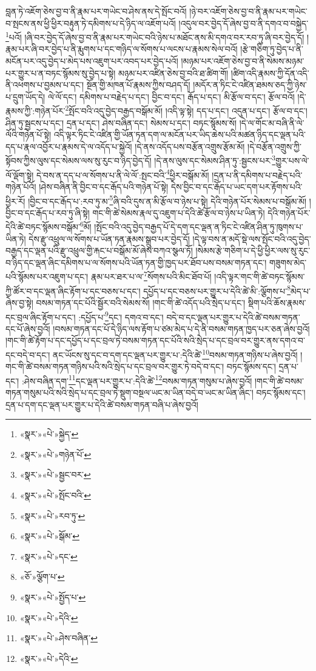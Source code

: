 བླན་ཏེ་འཇོག་ཅེས་བྱ་བ་ནི་རྣམ་པར་གཡེང་བ་ཤེས་ནས་དེ་སྤོང་བའོ། །ཉེ་བར་འཇོག་ཅེས་བྱ་བ་ནི་རྣམ་པར་གཡེང་བ་སྤངས་ནས་ཕྱི་ཕྱིར་བརྟུན་ཏེ་དམིགས་པ་དེ་ཉིད་ལ་འཇོག་པའོ། །འདུལ་བར་བྱེད་དོ་ཞེས་བྱ་བ་ནི་དགའ་བ་བསྐྱེད་\footnote{«སྣར་»«པེ་»སྐྱེད་}པའོ། །ཞི་བར་བྱེད་དོ་ཞེས་བྱ་བ་ནི་རྣམ་པར་གཡེང་བའི་ཉེས་པ་མཐོང་ནས་མི་དགའ་བར་རབ་ཏུ་ཞི་བར་བྱེད་དོ། །རྣམ་པར་ཞི་བར་བྱེད་པ་ནི་རྨུགས་པ་དང་གཉིད་ལ་སོགས་པ་ལངས་པ་རྣམས་སེལ་བའོ། །རྩེ་གཅིག་ཏུ་བྱེད་པ་ནི་མངོན་པར་འདུ་བྱེད་པ་མེད་པས་འཇུག་པར་འབད་པར་བྱེད་པའོ། །མཉམ་པར་འཇོག་ཅེས་བྱ་བ་ནི་སེམས་མཉམ་པར་གྱུར་པ་ན་བཏང་སྙོམས་སུ་བྱེད་པ་སྟེ། མཉམ་པར་འཛིན་ཅེས་བྱ་བའི་ཐ་ཚིག་གོ། །ཚིག་འདི་རྣམས་ཀྱི་དོན་འདི་ནི་འཕགས་པ་བྱམས་པ་དང་། སྔོན་གྱི་མཁན་པོ་རྣམས་ཀྱིས་བཤད་དོ། །མདོར་ན་ཏིང་ངེ་འཛིན་ཐམས་ཅད་ཀྱི་ཉེས་པ་དྲུག་ཡོད་དེ། ལེ་ལོ་དང་། དམིགས་པ་བརྗེད་པ་དང་། བྱིང་བ་དང་། རྒོད་པ་དང་། མི་རྩོལ་བ་དང་། རྩོལ་བའོ། །དེ་རྣམས་ཀྱི་:གཉེན་པོར་\footnote{«སྣར་»«པེ་»གཉེན་པོ་}སྤོང་བའི་འདུ་བྱེད་བརྒྱད་བསྒོམ་མོ། །འདི་ལྟ་སྟེ། དད་པ་དང་། འདུན་པ་དང་། རྩོལ་བ་དང་། ཤིན་ཏུ་སྦྱངས་པ་དང་། དྲན་པ་དང་། ཤེས་བཞིན་དང་། སེམས་པ་དང་། བཏང་སྙོམས་སོ། །དེ་ལ་གོང་མ་བཞི་ནི་ལེ་ལོའི་གཉེན་པོ་སྟེ། འདི་ལྟར་ཏིང་ངེ་འཛིན་གྱི་ཡོན་ཏན་དག་ལ་མངོན་པར་ཡིད་ཆེས་པའི་མཚན་ཉིད་དང་ལྡན་པའི་དད་པ་རྣལ་འབྱོར་པ་རྣམས་དེ་ལ་འདོད་པ་སྐྱེའོ། །དེ་ནས་འདོད་པས་བརྩོན་འགྲུས་རྩོམ་མོ། །དེ་བརྩོན་འགྲུས་ཀྱི་སྟོབས་ཀྱིས་ལུས་དང་སེམས་ལས་སུ་རུང་བ་ཉིད་བྱེད་དོ། །དེ་ནས་ལུས་དང་སེམས་ཤིན་ཏུ་:སྦྱངས་པར་\footnote{«སྣར་»«པེ་»སྦྱང་བར་}གྱུར་པས་ལེ་ལོ་ལྡོག་སྟེ། དེ་བས་ན་དད་པ་ལ་སོགས་པ་ནི་ལེ་ལོ་:སྤང་བའི་\footnote{«སྣར་»«པེ་»སྤོང་བའི་}ཕྱིར་བསྒོམ་མོ། །དྲན་པ་ནི་དམིགས་པ་བརྗེད་པའི་གཉེན་པོའོ། །ཤེས་བཞིན་ནི་བྱིང་བ་དང་རྒོད་པའི་གཉེན་པོ་སྟེ། དེས་བྱིང་བ་དང་རྒོད་པ་ཡང་དག་པར་རྟོགས་པའི་ཕྱིར་རོ། །བྱིང་བ་དང་རྒོད་པ་:རབ་ཏུ་མ་\footnote{«སྣར་»«པེ་»རབ་ཏུ་}ཞི་བའི་དུས་ན་མི་རྩོལ་བ་ཉེས་པ་སྟེ། དེའི་གཉེན་པོར་སེམས་པ་བསྒོམ་མོ། །བྱིང་བ་དང་རྒོད་པ་རབ་ཏུ་ཞི་སྟེ། གང་གི་ཚེ་སེམས་རྣལ་དུ་འཇུག་པ་དེའི་ཚེ་རྩོལ་བ་ཉེས་པ་ཡིན་ཏེ། དེའི་གཉེན་པོར་དེའི་ཚེ་བཏང་སྙོམས་བསྒོམ་\footnote{«སྣར་»«པེ་»སྒོམ་}མོ། །སྤོང་བའི་འདུ་བྱེད་བརྒྱད་པོ་དེ་དག་དང་ལྡན་ན་ཏིང་ངེ་འཛིན་ཤིན་ཏུ་ཁུགས་པ་ཡིན་ཏེ། དེས་རྫུ་འཕྲུལ་ལ་སོགས་པ་ཡོན་ཏན་རྣམས་སྒྲུབ་པར་བྱེད་དོ། །དེ་ལྟ་བས་ན་མདོ་སྡེ་ལས་སྤོང་བའི་འདུ་བྱེད་བརྒྱད་དང་ལྡན་པའི་རྫུ་འཕྲུལ་གྱི་རྐང་པ་བསྒོམ་མོ་ཞེས་བཀའ་སྩལ་ཏོ། །སེམས་རྩེ་གཅིག་པ་དེ་ཕྱི་ཕྱིར་ལས་སུ་རུང་བ་ཉིད་དང་ལྡན་ཞིང་དམིགས་པ་ལ་སོགས་པའི་ཡོན་ཏན་གྱི་ཁྱད་པར་ཐོབ་པས་བསམ་གཏན་དང་། གཟུགས་མེད་པའི་སྙོམས་པར་འཇུག་པ་དང་། རྣམ་པར་ཐར་པ་ལ་\footnote{«སྣར་»«པེ་»དང་}སོགས་པའི་མིང་ཐོབ་པོ། །འདི་ལྟར་གང་གི་ཚེ་བཏང་སྙོམས་ཀྱི་ཚོར་བ་དང་ལྡན་ཞིང་རྟོག་པ་དང་བཅས་པ་དང་། དཔྱོད་པ་དང་བཅས་པར་གྱུར་པ་དེའི་ཚེ་མི་:ལྕོགས་པ་\footnote{«ཅོ་»ལྕོག་པ་}མེད་པ་ཞེས་བྱ་སྟེ། བསམ་གཏན་དང་པོའི་སྦྱོར་བའི་སེམས་སོ། །གང་གི་ཚེ་འདོད་པའི་སྲེད་པ་དང་། སྡིག་པའི་ཆོས་རྣམས་དང་བྲལ་ཞིང་རྟོག་པ་དང་། :དཔྱོད་པ་\footnote{«སྣར་»«པེ་»སྤྱོད་པ་}དང་། དགའ་བ་དང་། བདེ་བ་དང་ལྡན་པར་གྱུར་པ་དེའི་ཚེ་བསམ་གཏན་དང་པོ་ཞེས་བྱའོ། །བསམ་གཏན་དང་པོ་དེ་ཉིད་ལས་རྟོག་པ་ཙམ་མེད་པ་དེ་ནི་བསམ་གཏན་ཁྱད་པར་ཅན་ཞེས་བྱའོ། །གང་གི་ཚེ་རྟོག་པ་དང་དཔྱོད་པ་དང་བྲལ་ཏེ་བསམ་གཏན་དང་པོའི་སའི་སྲེད་པ་དང་བྲལ་བར་གྱུར་ནས་དགའ་བ་དང་བདེ་བ་དང་། ནང་ཡོངས་སུ་དང་བ་དག་དང་ལྡན་པར་གྱུར་པ་:དེའི་ཚེ་\footnote{«སྣར་»«པེ་»དེའི་}བསམ་གཏན་གཉིས་པ་ཞེས་བྱའོ། །གང་གི་ཚེ་བསམ་གཏན་གཉིས་པའི་སའི་སྲེད་པ་དང་བྲལ་བར་གྱུར་ཏེ་བདེ་བ་དང་། བཏང་སྙོམས་དང་། དྲན་པ་དང་། :ཤེས་བཞིན་དག་\footnote{«སྣར་»«པེ་»ཤེས་བཞིན་}དང་ལྡན་པར་གྱུར་པ་:དེའི་ཚེ་\footnote{«སྣར་»«པེ་»དེའི་}བསམ་གཏན་གསུམ་པ་ཞེས་བྱའོ། །གང་གི་ཚེ་བསམ་གཏན་གསུམ་པའི་སའི་སྲེད་པ་དང་བྲལ་ཏེ་སྡུག་བསྔལ་ཡང་མ་ཡིན་བདེ་བ་ཡང་མ་ཡིན་ཞིང་། བཏང་སྙོམས་དང་། དྲན་པ་དག་དང་ལྡན་པར་གྱུར་པ་དེའི་ཚེ་བསམ་གཏན་བཞི་པ་ཞེས་བྱའོ། 